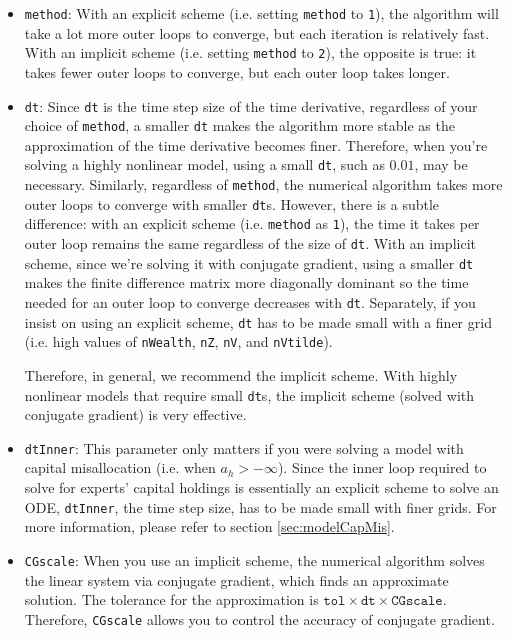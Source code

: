 \documentclass[12pt]{article}
\newcommand{\nWealthProg}{nWealth\xspace}
\newcommand{\nGrowthProg}{nZ\xspace}
\newcommand{\nStochasaticVolProg}{nV\xspace}
\newcommand{\nIdioVolProg}{nVtilde\xspace}
\begin{document}
\begin{itemize}
\item \texttt{method}: With an explicit scheme (i.e. setting \texttt{method} to \texttt{1}), the algorithm will take a lot more outer loops to converge, but each iteration is relatively fast. With an implicit scheme (i.e. setting \texttt{method} to \texttt{2}), the opposite is true: it takes fewer outer loops to converge, but each outer loop takes longer.
\item \texttt{dt}: Since \texttt{dt} is the time step size of the time derivative, regardless of your choice of \texttt{method}, a smaller \texttt{dt} makes the algorithm more stable as the approximation of the time derivative becomes finer. Therefore, when you're solving a highly nonlinear model, using a small \texttt{dt}, such as $0.01$, may be necessary. Similarly, regardless of \texttt{method}, the numerical algorithm takes more outer loops to converge with smaller \texttt{dt}s. However, there is a subtle difference: with an explicit scheme (i.e. \texttt{method} as \texttt{1}), the time it takes per outer loop remains the same regardless of the size of \texttt{dt}. With an implicit scheme, since we're solving it with conjugate gradient, using a smaller \texttt{dt} makes the finite difference matrix more diagonally dominant so the time needed for an outer loop to converge decreases with \texttt{dt}. Separately, if you insist on using an explicit scheme, \texttt{dt} has to be made small with a finer grid (i.e. high values of \texttt{\nWealthProg}, \texttt{\nGrowthProg}, \texttt{\nStochasaticVolProg}, and \texttt{\nIdioVolProg}).

Therefore, in general, we recommend the implicit scheme. With highly nonlinear models that require small \texttt{dt}s, the implicit scheme (solved with conjugate gradient) is very effective.

\item \texttt{dtInner}: This parameter only matters if you were solving a model with capital misallocation (i.e. when $a_h > -\infty$). Since the inner loop required to solve for experts' capital holdings is essentially an explicit scheme to solve an ODE, \texttt{dtInner}, the time step size, has to be made small with finer grids. For more information, please refer to section \ref{sec:modelCapMis}.
\item \texttt{CGscale}: When you use an implicit scheme, the numerical algorithm solves the linear system via conjugate gradient, which finds an approximate solution. The tolerance for the approximation is $\texttt{tol} \times \texttt{dt} \times \texttt{CGscale}$. Therefore, \texttt{CGscale} allows you to control the accuracy of conjugate gradient.
\end{itemize}
\end{document}
